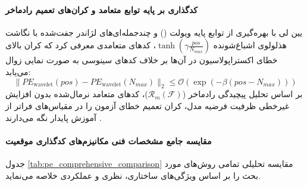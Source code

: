 \paragraph*{کدگذاری بر پایه توابع متعامد و کران‌های تعمیم رادماخر}
یین لی \cite{li2025theoretical} با بهره‌گیری از توابع پایه ویولت () و چندجمله‌ای‌های لژاندر جفت‌شده با نگاشت هذلولوی اشباع‌شونده $\tanh(\gamma \frac{pos}{N_{max}})$، کدهای متعامدی معرفی کرد که کران بالای خطای اکستراپولاسیون در آن‌ها بر خلاف کدهای سینوسی به صورت نمایی زوال می‌یابد:
\begin{equation}
    \|PE_{\text{wavelet}}(pos) - PE_{\text{wavelet}}(N_{max})\|_2 \le \mathcal{O}\left(\exp(-\beta(pos - N_{max}))\right)
\end{equation}
بر اساس تحلیل پیچیدگی رادماخر ($\mathcal{R}_m(\mathcal{F})$)، کدهای متعامد نرمال‌شده بدون افزایش غیرخطی ظرفیت فرضیه مدل، کران تعمیم خطای آزمون را در مقیاس‌های فراتر از آموزش پایدار نگه می‌دارند \cite{li2025theoretical}.

\paragraph*{مقایسه جامع مشخصات فنی مکانیزم‌های کدگذاری موقعیت}
جدول \ref{tab:pe_comprehensive_comparison} مقایسه تحلیلی تمامی روش‌های مورد بحث را بر اساس ویژگی‌های ساختاری، نظری و عملکردی خلاصه می‌نماید.

